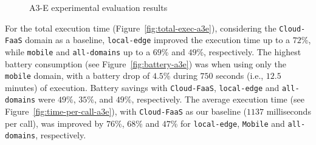 \begin{figure}[htb]
	\centering
	\captionsetup[subfigure]{width=0.3\textwidth}	
		\captionsetup[subfigure]{width=0.3\textwidth}
	\captionsetup[subfigure]{width=0.3\textwidth}	
	\caption{A3-E experimental evaluation results} \label{fig:exp-a3e}
\end{figure}


For the total execution time (Figure~\ref{fig:total-exec-a3e}), considering the \texttt{Cloud-FaaS} domain as a baseline, \texttt{local-edge} improved the execution time up to a $72$\%, while \texttt{mobile} and \texttt{all-domains} up to a $69$\% and $49$\%, respectively. The highest battery consumption (see Figure~\ref{fig:battery-a3e}) was when using only the \texttt{mobile} domain, with a battery drop of $4.5$\% during $750$ seconds (i.e., $12.5$ minutes) of execution. Battery savings with \texttt{Cloud-FaaS}, \texttt{local-edge} and \texttt{all-domains} were $49$\%, $35$\%, and $49$\%, respectively. The average execution time (see Figure~\ref{fig:time-per-call-a3e}), with \texttt{Cloud-FaaS} as our baseline ($1137$ milliseconds per call), was improved by $76$\%, $68$\% and $47$\% for \texttt{local-edge}, \texttt{Mobile} and \texttt{all-domains}, respectively. 

